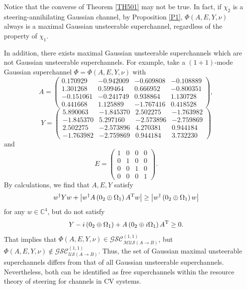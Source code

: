 \documentclass[10pt,aps,pra,amsfonts,amssymb,amsmath,%
floatfix,nofootinbib, groupedaddress,superscriptaddress,citesort,twocolumn
]{revtex4}%
\begin{document}
Notice that the converse of Theorem \ref{TH501}  may not be true. In fact, if ${\chi_2}$ is a steering-annihilating Gaussian channel, by Proposition \ref{P1}, %
$\Phi \left( A,E,Y,\nu \right)$ always is a maximal Gaussian  unsteerable superchannel, regardless of the property of $\chi_1$.



In addition, there exists maximal Gaussian  unsteerable superchannels which are not  Gaussian  unsteerable superchannels.
For example,
take a $(1+1)$-mode  Gaussian superchannel $ \Phi=\Phi \left( A,E,Y,\nu \right) $ with
	\[A = \left( {\begin{array}{*{20}{c}}
			{0.170929}&{ - 0.942009}&{ - 0.609808}&{ - 0.108889}\\
			{1.301268}&{0.599464}&{0.666952}&{ - 0.800351}\\
			{ - 0.151061}&{ - 0.241749}&{0.938864}&{1.130728}\\
			{0.441668}&{1.125889}&{ - 1.767416}&{0.418528}
	\end{array}} \right),\]
\[Y = \left( {\begin{array}{*{20}{c}}
		{5.890063}&{ - 1.845370}&{2.502275}&{ - 1.763982}\\
		{ - 1.845370}&{5.297160}&{ - 2.573896}&{ - 2.759869}\\
		{2.502275}&{ - 2.573896}&{4.270381}&{0.944184}\\
		{ - 1.763982}&{ - 2.759869}&{0.944184}&{3.732230}
\end{array}} \right)\]
and		\[E = \left( {\begin{array}{*{20}{c}}
		1&0&0&0\\
		0&1&0&0\\
		0&0&1&0\\
		0&0&0&1
\end{array}} \right).\]
By calculations, we find that $	A,E,Y $ satisfy
	\[{{w^\dag }Yw + \left| {{w^\dag }A\left( {{0_2} \oplus {\Omega _1}} \right){A^{\rm T}}w} \right| \ge \left| {{w^\dag }\left( {{0_2} \oplus {\Omega _1}} \right)w} \right|}\]
	for	any $w \in \mathbb{C}^4$,
but  do not satisfy
\[{Y - i\left( {{0_2} \oplus {\Omega _1}} \right) + A\left( {{0_2} \oplus i{\Omega_1}} \right){A^{\rm T}} \ge 0 .}\]
That implies that  $\Phi \left( A,E,Y,\nu \right) \in {\mathcal {GSC}}^{(1,1)}_{\mathcal {MUS}(A \rightarrow B)}$, but $\Phi \left( A,E,Y,\nu \right) \notin {\mathcal {GSC}}^{(1,1)}_{\mathcal {US}(A \rightarrow B)}$.
Thus, the set of Gaussian maximal unsteerable superchannels differs from that of all Gaussian unsteerable superchannels. Nevertheless, both can be identified as free superchannels within the resource theory of steering for channels in CV systems.
\end{document}
